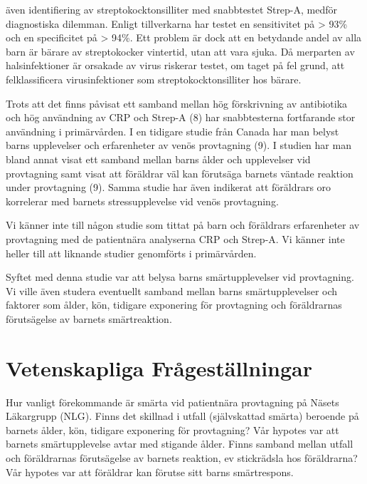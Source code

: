 \documentclass{nature}
\begin{document}
\"aven identifiering av streptokocktonsilliter med snabbtestet Strep-A, medf\"or
diagnostiska dilemman. Enligt tillverkarna har testet en sensitivitet p\r{a} > 93\%
och en specificitet p\r{a} > 94\%. Ett problem \"ar dock att en betydande andel av
alla
barn \"ar b\"arare av streptokocker vintertid, utan att vara sjuka. D\r{a} merparten av
halsinfektioner \"ar orsakade av virus riskerar testet, om taget p\r{a} fel grund, att
felklassificera virusinfektioner som streptokocktonsilliter hos b\"arare.

Trots att det finns p\r{a}visat ett samband mellan h\"og f\"orskrivning av antibiotika
och h\"og anv\"andning av CRP och Strep-A (8) har snabbtesterna fortfarande stor
anv\"andning i prim\"arv\r{a}rden. I en tidigare studie fr\r{a}n Canada har man belyst barns
upplevelser och erfarenheter av ven\"os provtagning (9). I studien har man bland
annat visat ett samband mellan barns \r{a}lder och upplevelser vid provtagning samt
visat att f\"or\"aldrar v\"al kan f\"oruts\"aga barnets v\"antade reaktion under provtagning
(9). Samma studie har \"aven indikerat att f\"or\"aldrars oro korrelerar med barnets
stressupplevelse vid ven\"os provtagning.

Vi k\"anner inte till n\r{a}gon studie som tittat p\r{a} barn och f\"or\"aldrars erfarenheter
av provtagning med de patientn\"ara analyserna CRP och Strep-A. Vi k\"anner inte
heller till att liknande studier genomf\"orts i prim\"arv\r{a}rden.

Syftet med denna studie var att belysa barns sm\"artupplevelser vid provtagning.
Vi ville \"aven studera eventuellt samband mellan barns sm\"artupplevelser och
faktorer som \r{a}lder, k\"on, tidigare exponering f\"or provtagning och f\"or\"aldrarnas
f\"oruts\"agelse av barnets sm\"artreaktion.

\section{Vetenskapliga Fr\r{a}gest\"allningar}

Hur vanligt f\"orekommande \"ar sm\"arta vid patientn\"ara provtagning p\r{a} N\"asets
L\"akargrupp (NLG).
Finns det skillnad i utfall (sj\"alvskattad sm\"arta) beroende p\r{a} barnets \r{a}lder,
k\"on, tidigare exponering f\"or provtagning? V\r{a}r hypotes var att barnets
sm\"artupplevelse avtar med stigande \r{a}lder.
Finns samband mellan utfall och f\"or\"aldrarnas f\"oruts\"agelse av barnets reaktion,
ev stickr\"adsla hos f\"or\"aldrarna? V\r{a}r hypotes var att f\"or\"aldrar kan f\"orutse sitt
barns sm\"artrespons.
\end{document}

